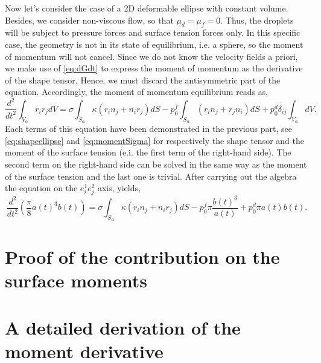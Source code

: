 Now let's consider the case of a 2D deformable ellipse with constant volume. 
Besides, we consider non-viscous flow, so that $\mu_d = \mu_f = 0$.  
Thus, the droplets will be subject to pressure forces and surface tension forces only.  
In this specific case, the geometry is not in its state of equilibrium, i.e. a sphere, so the moment of momentum will not cancel.  
Since we do not know the velocity fields a priori, we make use of \ref{eq:dGdt} to express the moment of momentum as the derivative of the shape tensor.
Hence, we must discard the antisymmetric part of the equation. 
Accordingly, the moment of momentum equilibrium reads as, 
\begin{equation}
    \frac{d^2}{dt^2}\int_{V_\alpha} r_ir_j dV
    =
    \sigma \int_{S_\alpha} \kappa (r_i  n_j+n_ir_j)   dS
    - p^f_0\int_{S_\alpha}  (r_i n_j+r_j n_i) dS
    + p^d_0\delta_{ij}\int_{V_\alpha} dV. 
\end{equation}
Each terms of this equation have been demonstrated in the previous part, see \ref{eq:shapeellipse} and \ref{eq:momentSigma} for respectively the shape tensor and the moment of the surface tension (e.i. the first term of the right-hand side). 
The second term on the right-hand side can be solved in the same way as the moment of the surface tension and the last one is trivial. 
After carrying out the algebra the equation on the $e^1_i e^2_j$ axis, yields, 
\begin{equation}
    \frac{d^2}{dt^2}(\frac{\pi}{8}a(t)^3b(t))
    =
    \sigma \int_{S_\alpha} \kappa (r_i  n_j+n_ir_j)   dS
    - p^f_0 \pi \frac{b(t)^3}{a(t)}
    + p^d_0 \pi a(t)b(t). 
\end{equation}
\section{Proof of the contribution on the surface moments}



\section{A detailed derivation of the moment derivative}

